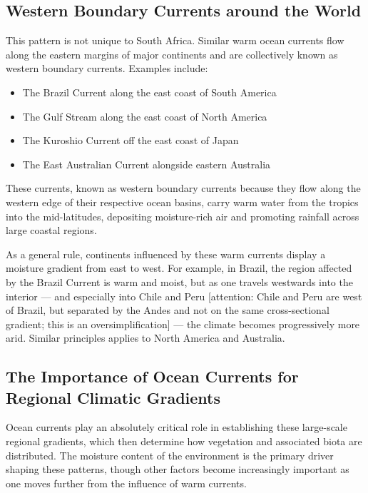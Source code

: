 \documentclass[
  10pt,
]{book}
\providecommand{\tightlist}{%
  \setlength{\itemsep}{0pt}\setlength{\parskip}{0pt}}
\begin{document}
\subsection{Western Boundary Currents around the
World}\label{western-boundary-currents-around-the-world}

This pattern is not unique to South Africa. Similar warm ocean currents
flow along the eastern margins of major continents and are collectively
known as western boundary currents. Examples include:

\begin{itemize}
\tightlist
\item
  The Brazil Current along the east coast of South America
\item
  The Gulf Stream along the east coast of North America
\item
  The Kuroshio Current off the east coast of Japan
\item
  The East Australian Current alongside eastern Australia
\end{itemize}

These currents, known as western boundary currents because they flow
along the western edge of their respective ocean basins, carry warm
water from the tropics into the mid-latitudes, depositing moisture-rich
air and promoting rainfall across large coastal regions.

As a general rule, continents influenced by these warm currents display
a moisture gradient from east to west. For example, in Brazil, the
region affected by the Brazil Current is warm and moist, but as one
travels westwards into the interior --- and especially into Chile and
Peru {[}attention: Chile and Peru are west of Brazil, but separated by
the Andes and not on the same cross-sectional gradient; this is an
oversimplification{]} --- the climate becomes progressively more arid.
Similar principles applies to North America and Australia.

\subsection{The Importance of Ocean Currents for Regional Climatic
Gradients}\label{the-importance-of-ocean-currents-for-regional-climatic-gradients}

Ocean currents play an absolutely critical role in establishing these
large-scale regional gradients, which then determine how vegetation and
associated biota are distributed. The moisture content of the
environment is the primary driver shaping these patterns, though other
factors become increasingly important as one moves further from the
influence of warm currents.
\end{document}
